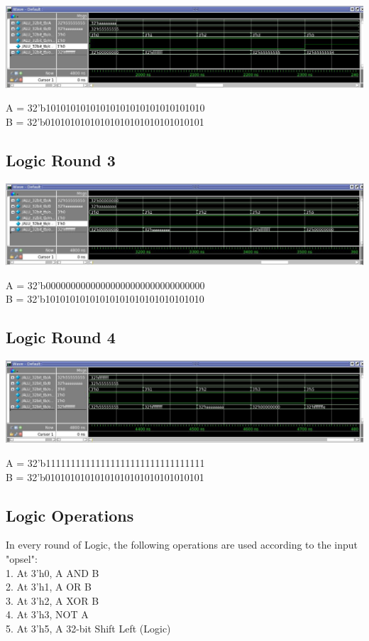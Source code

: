 \documentclass[paper=letter, fontsize=11pt]{scrartcl}
\numberwithin{equation}{section} %
\numberwithin{figure}{section} %
\numberwithin{table}{section} %
\begin{document}
	\centering
			\includegraphics[width=1.0\textwidth]{Log2}
				\label{fig:Log2}
\raggedright A = 32'b10101010101010101010101010101010\\ 
 B = 32'b01010101010101010101010101010101
 
\subsection{Logic Round 3}

	\centering
			\includegraphics[width=1.0\textwidth]{Log3}
				\label{fig:Log3}
\raggedright A = 32'b00000000000000000000000000000000\\ 
B = 32'b10101010101010101010101010101010

\subsection{Logic Round 4}

	\centering
			\includegraphics[width=1.0\textwidth]{Log4}
				\label{fig:Log4}
\raggedright A = 32'b11111111111111111111111111111111\\
B = 32'b01010101010101010101010101010101

\subsection{Logic Operations}
\begin{flushleft}
	In every round of Logic, the following operations are used according to the input "opsel": \\ [15pt]
	1. At 3'h0, A AND B\\ 
	2. At 3'h1, A OR B\\
	3. At 3'h2, A XOR B\\
	4. At 3'h3, NOT A\\
	5. At 3'h5, A 32-bit Shift Left (Logic) \\
    
\end{flushleft}
\end{document}
